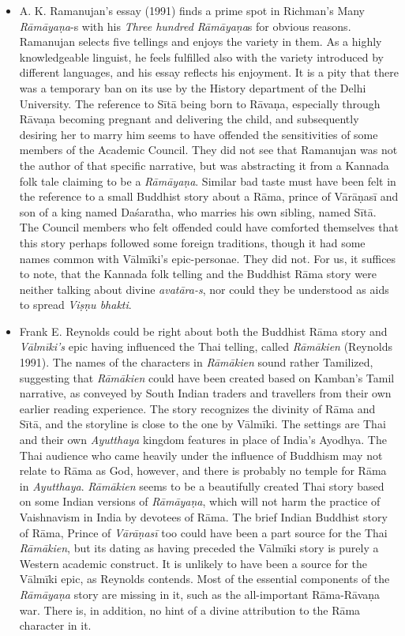 \begin{itemize}
 \item A. K. Ramanujan’s essay (1991) finds a prime spot in Richman’s Many \textit{Rāmāyaṇa}-s with his \textit{Three hundred} \textit{Rāmāyaṇa}s for obvious reasons. Ramanujan selects five tellings and enjoys the variety in them. As a highly knowledgeable linguist, he feels fulfilled also with the variety introduced by different languages, and his essay reflects his enjoyment. It is a pity that there was a temporary ban on its use by the History department of the Delhi University. The reference to Sītā being born to Rāvaṇa, especially through Rāvaṇa becoming pregnant and delivering the child, and subsequently desiring her to marry him seems to have offended the sensitivities of some members of the Academic Council. They did not see that Ramanujan was not the author of that specific narrative, but was abstracting it from a Kannada folk tale claiming to be a \textit{Rāmāyaṇa}. Similar bad taste must have been felt in the reference to a small Buddhist story about a Rāma, prince of Vārāṇasī and son of a king named Daśaratha, who marries his own sibling, named Sītā. The Council members who felt offended could have comforted themselves that this story perhaps followed some foreign traditions, though it had some names common with Vālmīki’s epic-personae. They did not. For us, it suffices to note, that the Kannada folk telling and the Buddhist Rāma story were neither talking about divine \textit{avatāra-s}, nor could they be understood as aids to spread \textit{Viṣṇu bhakti}.

 \item Frank E. Reynolds could be right about both the Buddhist Rāma story and \textit{Vālmīki’s} epic having influenced the Thai telling, called \textit{Rāmākien} (Reynolds 1991). The names of the characters in \textit{Rāmākien} sound rather Tamilized, suggesting that \textit{Rāmākien} could have been created based on Kamban’s Tamil narrative, as conveyed by South Indian traders and travellers from their own earlier reading experience. The story recognizes the divinity of Rāma and Sītā, and the storyline is close to the one by Vālmīki. The settings are Thai and their own \textit{Ayutthaya} kingdom features in place of India’s Ayodhya. The Thai audience who came heavily under the influence of Buddhism may not relate to Rāma as God, however, and there is probably no temple for Rāma in \textit{Ayutthaya}. \textit{Rāmākien} seems to be a beautifully created Thai story based on some Indian versions of \textit{Rāmāyaṇa}, which will not harm the practice of Vaishnavism in India by devotees of Rāma. The brief Indian Buddhist story of Rāma, Prince of \textit{Vārāṇasī} too could have been a part source for the Thai \textit{Rāmākien}, but its dating as having preceded the Vālmīki story is purely a Western academic construct. It is unlikely to have been a source for the Vālmīki epic, as Reynolds contends. Most of the essential components of the \textit{Rāmāyaṇa} story are missing in it, such as the all-important Rāma-Rāvaṇa war. There is, in addition, no hint of a divine attribution to the Rāma character in it.


\end{itemize}
